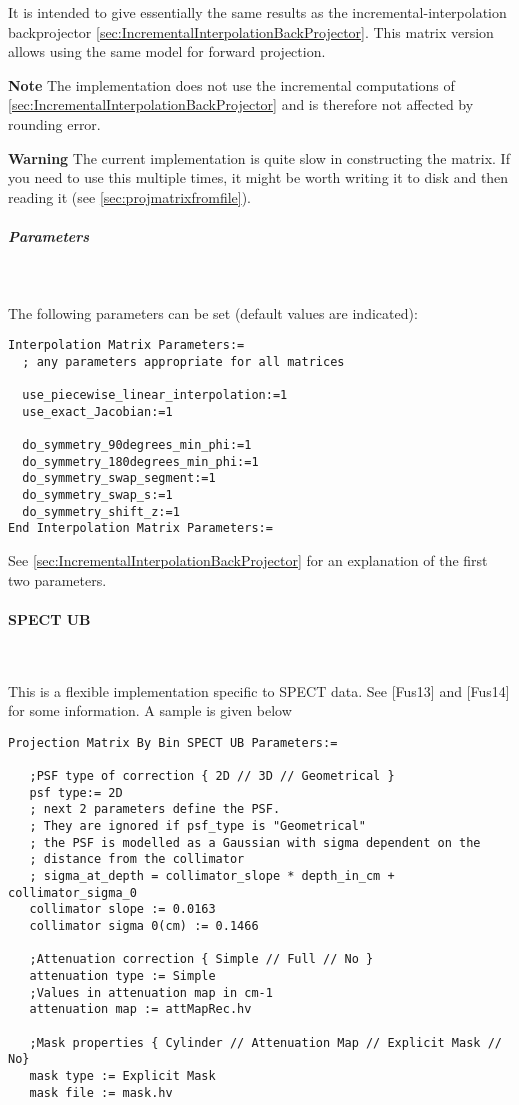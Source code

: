 \documentclass{article}
\newcommand{\subsubsubsection}[1]{\paragraph{#1}\mbox{} \\}
\newcommand{\subsubsubsubsection}[1]{\subparagraph{#1} \mbox{} \\}
\begin{document}
{{It is intended to give
essentially the same results as the incremental-interpolation backprojector
\ref{sec:IncrementalInterpolationBackProjector}.
This matrix version allows using the same model for forward projection. 

\textbf{Note} The implementation does not use the incremental computations of 
\ref{sec:IncrementalInterpolationBackProjector} and is therefore not affected 
by rounding error.

\textbf{Warning} The current implementation is quite slow in constructing the matrix.
If you need to use this multiple times, it might be worth writing it to disk and
then reading it (see \ref{sec:projmatrixfromfile}).

{ \subsubsubsubsection{Parameters}
}
The following parameters can be set (default values are indicated):
\begin{verbatim}
Interpolation Matrix Parameters:=
  ; any parameters appropriate for all matrices

  use_piecewise_linear_interpolation:=1
  use_exact_Jacobian:=1

  do_symmetry_90degrees_min_phi:=1
  do_symmetry_180degrees_min_phi:=1
  do_symmetry_swap_segment:=1
  do_symmetry_swap_s:=1
  do_symmetry_shift_z:=1
End Interpolation Matrix Parameters:=
\end{verbatim}

See \ref{sec:IncrementalInterpolationBackProjector} for an explanation 
of the first two parameters.

{ \subsubsubsection{SPECT UB}
}
\label{sec:projmatrixSPECTUB}
This is a flexible implementation specific to SPECT data. See [Fus13] and [Fus14] for some information.
A sample is given below

\begin{verbatim}
Projection Matrix By Bin SPECT UB Parameters:=

   ;PSF type of correction { 2D // 3D // Geometrical }
   psf type:= 2D
   ; next 2 parameters define the PSF. 
   ; They are ignored if psf_type is "Geometrical"
   ; the PSF is modelled as a Gaussian with sigma dependent on the 
   ; distance from the collimator
   ; sigma_at_depth = collimator_slope * depth_in_cm + collimator_sigma_0
   collimator slope := 0.0163
   collimator sigma 0(cm) := 0.1466

   ;Attenuation correction { Simple // Full // No }
   attenuation type := Simple
   ;Values in attenuation map in cm-1
   attenuation map := attMapRec.hv

   ;Mask properties { Cylinder // Attenuation Map // Explicit Mask // No}
   mask type := Explicit Mask
   mask file := mask.hv


\end{verbatim}}}
\end{document}
